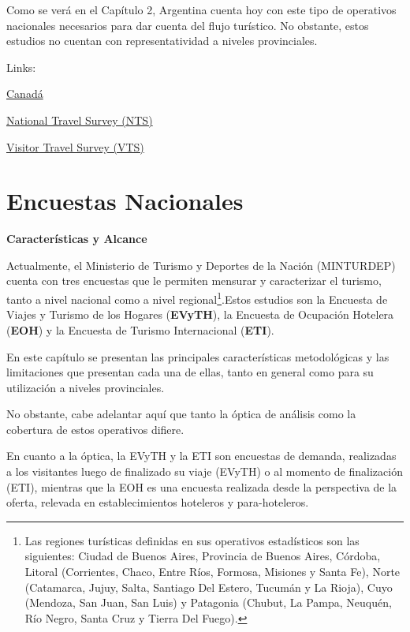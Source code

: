\documentclass[
  openany]{book}
\begin{document}
Como se verá en el Capítulo 2, Argentina cuenta hoy con este tipo de operativos nacionales necesarios para dar cuenta del flujo turístico. No obstante, estos estudios no cuentan con representatividad a niveles provinciales.

Links:

\href{https://www150.statcan.gc.ca/n1/en/subjects/travel_and_tourism}{Canadá}

\href{https://www23.statcan.gc.ca/imdb/p2SV.pl?Function=getSurvey\&SDDS=5232}{National Travel Survey (NTS)}

\href{https://www23.statcan.gc.ca/imdb/p2SV.pl?Function=getSurvey\&SDDS=5261}{Visitor Travel Survey (VTS)}

\hypertarget{encuestas-nacionales}{%
\chapter{\texorpdfstring{\textbf{Encuestas Nacionales}}{Encuestas Nacionales}}\label{encuestas-nacionales}}

\textbf{Características y Alcance}

Actualmente, el Ministerio de Turismo y Deportes de la Nación (MINTURDEP) cuenta con tres encuestas que le permiten mensurar y caracterizar el turismo, tanto a nivel nacional como a nivel regional\footnote{Las regiones turísticas definidas en sus operativos estadísticos son las siguientes: Ciudad de Buenos Aires, Provincia de Buenos Aires, Córdoba, Litoral (Corrientes, Chaco, Entre Ríos, Formosa, Misiones y Santa Fe), Norte (Catamarca, Jujuy, Salta, Santiago Del Estero, Tucumán y La Rioja), Cuyo (Mendoza, San Juan, San Luis) y Patagonia (Chubut, La Pampa, Neuquén, Río Negro, Santa Cruz y Tierra Del Fuego).}.Estos estudios son la Encuesta de Viajes y Turismo de los Hogares (\textbf{EVyTH}), la Encuesta de Ocupación Hotelera (\textbf{EOH}) y la Encuesta de Turismo Internacional (\textbf{ETI}).

En este capítulo se presentan las principales características metodológicas y las limitaciones que presentan cada una de ellas, tanto en general como para su utilización a niveles provinciales.

No obstante, cabe adelantar aquí que tanto la óptica de análisis como la cobertura de estos operativos difiere.

En cuanto a la óptica, la EVyTH y la ETI son encuestas de demanda, realizadas a los visitantes luego de finalizado su viaje (EVyTH) o al momento de finalización (ETI), mientras que la EOH es una encuesta realizada desde la perspectiva de la oferta, relevada en establecimientos hoteleros y para-hoteleros.
\end{document}
